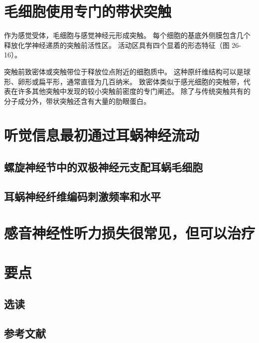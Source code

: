 \section{毛细胞使用专门的带状突触}

作为感觉受体，毛细胞与感觉神经元形成突触。 每个细胞的基底外侧膜包含几个释放化学神经递质的突触前活性区。 活动区具有四个显着的形态特征（图 26-16）。

突触前致密体或突触带位于释放位点附近的细胞质中。 这种原纤维结构可以是球形、卵形或扁平形，通常直径为几百纳米。 致密体类似于感光细胞的突触带，代表在许多其他突触中发现的较小突触前密度的专门阐述。 除了与传统突触共有的分子成分外，带状突触还含有大量的肋眼蛋白。

\section{听觉信息最初通过耳蜗神经流动}
\subsection{螺旋神经节中的双极神经元支配耳蜗毛细胞}
\subsection{耳蜗神经纤维编码刺激频率和水平}

\section{感音神经性听力损失很常见，但可以治疗}

\section{要点}
\subsection{选读}
\subsection{参考文献}